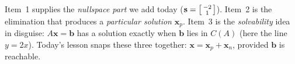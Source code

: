 \documentclass[10pt]{article}
\newcommand{\xx}{\mathbf{x}}
\newcommand{\bb}{\mathbf{b}}
\newcommand{\svec}{\mathbf{s}}
\begin{document}
\begin{teachernote}
Item~1 supplies the \emph{nullspace part} we add today ($\svec=\begin{bsmallmatrix} -2\\1 \end{bsmallmatrix}$).
Item~2 is the elimination that produces a \emph{particular solution} $\xx_p$. Item~3 is the
\emph{solvability} idea in disguise: $A\xx=\bb$ has a solution exactly when $\bb$ lies in $C(A)$ (here the
line $y=2x$). Today's lesson snaps these three together: $\xx=\xx_p+\xx_n$, provided $\bb$ is reachable.
\end{teachernote}
\end{document}
